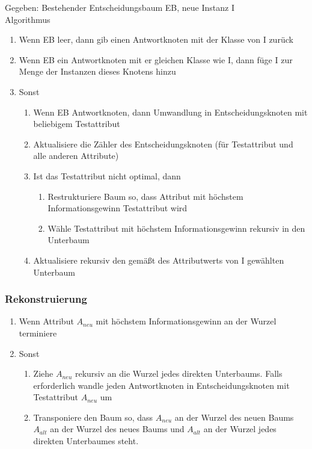 \documentclass[paper=a4, fontsize=11pt]{scrartcl} %
\numberwithin{equation}{section} %
\numberwithin{figure}{section} %
\numberwithin{table}{section} %
\begin{document}
Gegeben: Bestehender Entscheidungsbaum EB, neue Instanz I\\ 
Algorithmus
\begin{enumerate}
\item Wenn EB leer, dann gib einen Antwortknoten mit der Klasse von I zurück
\item Wenn EB ein Antwortknoten mit er gleichen Klasse wie I, dann füge I zur Menge der Instanzen dieses Knotens hinzu
\item Sonst
\begin{enumerate}
\item Wenn EB Antwortknoten, dann Umwandlung in Entscheidungsknoten mit beliebigem Testattribut
\item Aktualisiere die Zähler des Entscheidungsknoten (für Testattribut und alle anderen Attribute)
\item Ist das Testattribut nicht optimal, dann
\begin{enumerate}
\item Restrukturiere Baum so, dass Attribut mit höchstem Informationsgewinn Testattribut wird
\item Wähle Testattribut mit höchstem Informationsgewinn rekursiv in den Unterbaum
\end{enumerate}
\item Aktualisiere rekursiv den gemäßt des Attributwerts von I gewählten Unterbaum
\end{enumerate}
\end{enumerate}

\subsubsection{Rekonstruierung}

\begin{enumerate}
\item Wenn Attribut $A_{neu}$ mit höchstem Informationsgewinn an der Wurzel terminiere
\item Sonst 
\begin{enumerate}
\item Ziehe $A_{neu}$ rekursiv an die Wurzel jedes direkten Unterbaums. Falls erforderlich wandle jeden Antwortknoten in Entscheidungsknoten mit Testattribut $A_{neu}$ um
\item Transponiere den Baum so, dass $A_{neu}$ an der Wurzel des neuen Baums $A_{alt}$ an der Wurzel des neues Baums und $A_{alt}$ an der Wurzel jedes direkten Unterbaumes steht.
\end{enumerate}
\end{enumerate}
\end{document}

